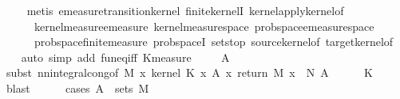 \begin{isabellebody}
\ \ \ \isamarkupfalse%
\ {\isacharparenleft}{\kern0pt}metis\ emeasure{\isacharunderscore}{\kern0pt}transition{\isacharunderscore}{\kern0pt}kernel\ finite{\isacharunderscore}{\kern0pt}kernelI\ kernel{\isacharunderscore}{\kern0pt}apply{\isacharunderscore}{\kern0pt}kernel{\isacharunderscore}{\kern0pt}of\isanewline
\ \ \ \ \ \ kernel{\isacharunderscore}{\kern0pt}measure{\isacharunderscore}{\kern0pt}emeasure\ kernel{\isacharunderscore}{\kern0pt}measure{\isacharunderscore}{\kern0pt}space\ prob{\isacharunderscore}{\kern0pt}space{\isachardot}{\kern0pt}emeasure{\isacharunderscore}{\kern0pt}space{\isacharunderscore}{\kern0pt}{}\isanewline
\ \ \ \ \ \ prob{\isacharunderscore}{\kern0pt}space{\isachardot}{\kern0pt}finite{\isacharunderscore}{\kern0pt}measure\ prob{\isacharunderscore}{\kern0pt}spaceI\ sets{\isachardot}{\kern0pt}top\ source{\isacharunderscore}{\kern0pt}kernel{\isacharunderscore}{\kern0pt}of\ target{\isacharunderscore}{\kern0pt}kernel{\isacharunderscore}{\kern0pt}of{\isacharparenright}{\kern0pt}\isanewline
\ \ \isamarkupfalse%
\ {\isacharparenleft}{\kern0pt}auto\ simp\ add{\isacharcolon}{\kern0pt}\ fun{\isacharunderscore}{\kern0pt}eq{\isacharunderscore}{\kern0pt}iff\ K{}{\isacharunderscore}{\kern0pt}measure{\isacharparenright}{\kern0pt}\isanewline
\ \ \isamarkupfalse%
\ \ A{\isacharprime}{\kern0pt}\isanewline
\ \ \ \ \isamarkupfalse%
\ {\isacharparenleft}{\kern0pt}subst\ nn{\isacharunderscore}{\kern0pt}integral{\isacharunderscore}{\kern0pt}cong{\isacharbrackleft}{\kern0pt}of\ M\ {\isachardoublequoteopen}{\isasymlambda}x{\isachardot}{\kern0pt}\ {\isacharparenleft}{\kern0pt}kernel\ K\ x\ A{\isacharprime}{\kern0pt}{\isacharparenright}{\kern0pt}{\isachardoublequoteclose}\ {\isachardoublequoteopen}{\isacharparenleft}{\kern0pt}{\isasymlambda}x{\isachardot}{\kern0pt}\ {\isacharparenleft}{\kern0pt}{\isacharparenleft}{\kern0pt}return\ M\ x{\isacharparenright}{\kern0pt}\ {\isasymstar}\ N{\isacharparenright}{\kern0pt}\ A{\isacharprime}{\kern0pt}{\isacharparenright}{\kern0pt}{\isachardoublequoteclose}{\isacharbrackright}{\kern0pt}{\isacharparenright}{\kern0pt}\isanewline
\ \ \ \ \isamarkupfalse%
\ K{}\ \isamarkupfalse%
\ blast\isanewline
\ \ \ \ \isamarkupfalse%
\ {\isacharparenleft}{\kern0pt}cases\ {\isachardoublequoteopen}A{\isacharprime}{\kern0pt}\ {\isasymin}\ sets\ M{\isachardoublequoteclose}{\isacharparenright}{\kern0pt}\isanewline
\ \ \ \ \isamarkupfalse%

\end{isabellebody}
